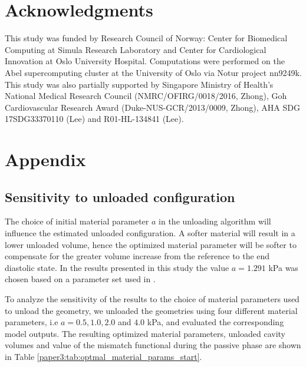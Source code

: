 \section*{Acknowledgments}
This study was funded by Research Council of Norway: Center
for Biomedical Computing at Simula Research Laboratory and Center
for Cardiological Innovation at Oslo University Hospital.
Computations were performed on the Abel supercomputing cluster at
the University of Oslo via Notur project nn9249k. This study was also
partially supported by Singapore Ministry of Health's National
Medical Research Council (NMRC/OFIRG/0018/2016, Zhong), Goh
Cardiovascular Research Award (Duke-NUS-GCR/2013/0009, Zhong),
AHA SDG 17SDG33370110 (Lee) and R01-HL-134841 (Lee).



\section{Appendix}


\subsection{Sensitivity to unloaded configuration}
\label{paper3:sec:unloaded_sens}

The choice of initial material parameter $a$ in the unloading algorithm
will influence the estimated unloaded configuration. A softer material
will result in a lower unloaded volume, hence the optimized material
parameter will be softer to compensate for the greater volume increase
from the reference to the end diastolic state. In the results
presented in this study the value $a=1.291$ kPa was chosen based on
a parameter set used in \citep{asner2015estimation}.

To analyze the sensitivity of the results to the choice of material
parameters used to unload the geometry, we unloaded the geometries
using four different material parameters, i.e $a = 0.5, 1.0, 2.0$ and
$4.0$ kPa, and evaluated the corresponding model outputs. The resulting
optimized material parameters, unloaded cavity volumes and value of the
mismatch functional during the passive phase are shown in Table
\ref{paper3:tab:optmal_material_params_start}.


